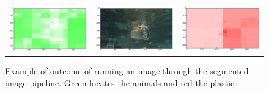 \begin{figure}
\begin{tabular}{ccc}
\includegraphics[keepaspectratio=true,width=\segwidth]{images/segment/20607_01__animals__.png} &
\includegraphics[keepaspectratio=true,width=\segwidth]{images/segment/20607_01__image__.png} &
\includegraphics[keepaspectratio=true,width=\segwidth]{images/segment/20607_01__plastic__.png}
	\end{tabular}
\fi
\captionsetup{width=.8\textwidth}
\caption{Example of outcome of running an image through the segmented image pipeline. Green locates the animals and red the plastic}
\label{fig:sub-matrix}
\end{figure}